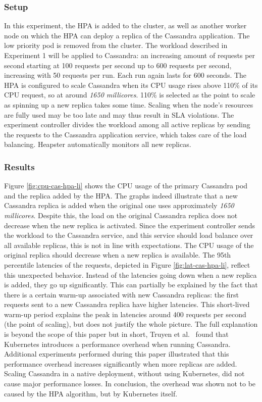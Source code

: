 \subsubsection{Setup}
In this experiment, the HPA is added to the cluster, as well as another worker node on which the HPA can deploy a replica of the Cassandra application. The low priority pod is removed from the cluster. The workload described in Experiment 1 will be applied to Cassandra: an increasing amount of requests per second starting at 100 requests per second up to 600 requests per second, increasing with 50 requests per run. Each run again lasts for 600 seconds. The HPA is configured to scale Cassandra when its CPU usage rises above 110\% of its CPU request, so at around \textit{1650 millicores}. 110\% is selected as the point to scale as spinning up a new replica takes some time. Scaling when the node's resources are fully used may be too late and may thus result in SLA violations. The experiment controller divides the workload among all active replicas by sending the requests to the Cassandra application service, which takes care of the load balancing. Heapster automatically monitors all new replicas. 

\subsubsection{Results}
Figure \ref{fig:cpu-cas-hpa-li} shows the CPU usage of the primary Cassandra pod and the replica added by the HPA. The graphs indeed illustrate that a new Cassandra replica is added when the original one uses approximately \textit{1650 millicores}. Despite this, the load on the original Cassandra replica does not decrease when the new replica is activated. Since the experiment controller sends the workload to the Cassandra service, and this service should load balance over all available replicas, this is not in line with expectations. The CPU usage of the original replica should decrease when a new replica is available. The 95th percentile latencies of the requests, depicted in Figure \ref{fig:lat-cas-hpa-li}, reflect this unexpected behavior. Instead of the latencies going down when a new replica is added, they go up significantly. This can partially be explained by the fact that there is a certain warm-up associated with new Cassandra replicas: the first requests sent to a new Cassandra replica have higher latencies. This short-lived warm-up period explains the peak in latencies around 400 requests per second (the point of scaling), but does not justify the whole picture. The full explanation is beyond the scope of this paper but in short, Truyen et al.~\citep{TruyenEddy2019Pooc} found that Kubernetes introduces a performance overhead when running Cassandra. Additional experiments performed during this paper illustrated that this performance overhead increases significantly when more replicas are added. Scaling Cassandra in a native deployment, without using Kubernetes, did not cause major performance losses. In conclusion, the overhead was shown not to be caused by the HPA algorithm, but by Kubernetes itself.

